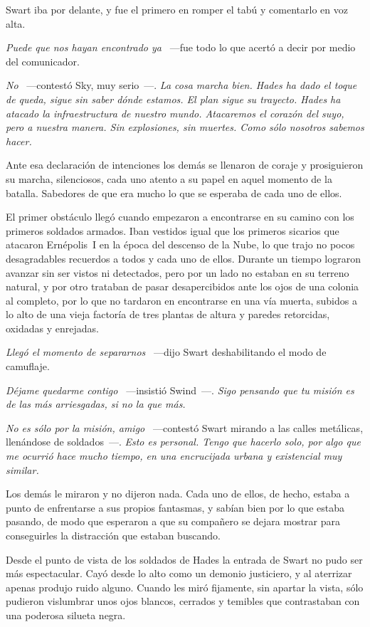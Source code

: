 Swart iba por delante, y fue el primero en romper el tabú y comentarlo en voz alta.

\emph{Puede que nos hayan encontrado ya} ~---fue todo lo que acertó a decir por medio del comunicador.

\emph{No} ~---contestó Sky, muy serio~---. \emph{La cosa marcha bien. Hades ha dado el toque de queda, sigue sin saber dónde estamos. El plan sigue su trayecto. Hades ha atacado la infraestructura de nuestro mundo. Atacaremos el corazón del suyo, pero a nuestra manera. Sin explosiones, sin muertes. Como sólo nosotros sabemos hacer.}

Ante esa declaración de intenciones los demás se llenaron de coraje y prosiguieron su marcha, silenciosos, cada uno atento a su papel en aquel momento de la batalla. Sabedores de que era mucho lo que se esperaba de cada uno de ellos.

El primer obstáculo llegó cuando empezaron a encontrarse en su camino con los primeros soldados armados. Iban vestidos igual que los primeros sicarios que atacaron Ernépolis~I en la época del descenso de la Nube, lo que trajo no pocos desagradables recuerdos a todos y cada uno de ellos. Durante un tiempo lograron avanzar sin ser vistos ni detectados, pero por un lado no estaban en su terreno natural, y por otro trataban de pasar desapercibidos ante los ojos de una colonia al completo, por lo que no tardaron en encontrarse en una vía muerta, subidos a lo alto de una vieja factoría de tres plantas de altura y paredes retorcidas, oxidadas y enrejadas.

\emph{Llegó el momento de separarnos} ~---dijo Swart deshabilitando el modo de camuflaje.

\emph{Déjame quedarme contigo} ~---insistió Swind~---. \emph{Sigo pensando que tu misión es de las más arriesgadas, si no la que más.}

\emph{No es sólo por la misión, amigo} ~---contestó Swart mirando a las calles metálicas, llenándose de soldados~---. \emph{Esto es personal. Tengo que hacerlo solo, por algo que me ocurrió hace mucho tiempo, en una encrucijada urbana y existencial muy similar.}

Los demás le miraron y no dijeron nada. Cada uno de ellos, de hecho, estaba a punto de enfrentarse a sus propios fantasmas, y sabían bien por lo que estaba pasando, de modo que esperaron a que su compañero se dejara mostrar para conseguirles la distracción que estaban buscando.

Desde el punto de vista de los soldados de Hades la entrada de Swart no pudo ser más espectacular. Cayó desde lo alto como un demonio justiciero, y al aterrizar apenas produjo ruido alguno. Cuando les miró fijamente, sin apartar la vista, sólo pudieron vislumbrar unos ojos blancos, cerrados y temibles que contrastaban con una poderosa silueta negra.


